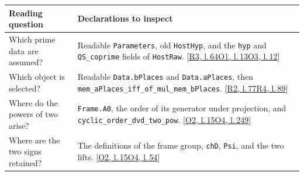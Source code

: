 \documentclass[12pt,letterpaper]{article}
\newcommand{\id}[1]{{\small\nolinkurl{#1}}}
\begin{document}
\begin{center}\small
\begin{tabularx}{\linewidth}{@{}p{.29\linewidth}Y@{}}\toprule
Reading question & Declarations to inspect\\\midrule
Which prime data are assumed? & Readable \id{Parameters}, old \id{HostHyp}, and the \id{hyp} and \id{QS_coprime} fields of \id{HostRaw}.  {\footnotesize\sffamily\color{mute}[\href{https://github.com/leanprover-community/riemann-hypothesis/blob/e063a923620ee7787b4a1270421478645bf66bdb/src/New/Reduction/Data/FieldsAndPlaces.lean\#L64}{R3, l.\,64}\enspace \href{https://github.com/nousentllc/riemann-hypothesis/blob/40e56bab026552e089d7afcfeff08d2defb9c005/src/Formalism/FrobeniusOrbits/Statement.lean\#L13}{O1, l.\,13}\enspace \href{https://github.com/nousentllc/riemann-hypothesis/blob/40e56bab026552e089d7afcfeff08d2defb9c005/src/Formalism/SharpRestriction/RamificationFrobenius/TotientGaloisClasses/ConjEMemHostFIff.lean\#L12}{O3, l.\,12}]}\\
Which object is selected? & Readable \id{Data.bPlaces} and \id{Data.aPlaces}, then \id{mem_aPlaces_iff_of_mul_mem_bPlaces}.  {\footnotesize\sffamily\color{mute}[\href{https://github.com/leanprover-community/riemann-hypothesis/blob/e063a923620ee7787b4a1270421478645bf66bdb/src/New/Reduction/Data/AdmissibleData.lean\#L77}{R2, l.\,77}\enspace \href{https://github.com/leanprover-community/riemann-hypothesis/blob/e063a923620ee7787b4a1270421478645bf66bdb/src/New/Reduction/PrimeSums.lean\#L89}{R4, l.\,89}]}\\
Where do the powers of two arise? & \id{Frame.A0}, the order of its generator under projection, and \id{cyclic_order_dvd_two_pow}.  {\footnotesize\sffamily\color{mute}[\href{https://github.com/nousentllc/riemann-hypothesis/blob/40e56bab026552e089d7afcfeff08d2defb9c005/src/Formalism/SharpRestriction/RamificationFrobenius/TotientGaloisClasses/ZsmulGeneratorEqZeroOfProjection.lean\#L15}{O2, l.\,15}\enspace \href{https://github.com/nousentllc/riemann-hypothesis/blob/40e56bab026552e089d7afcfeff08d2defb9c005/src/Formalism/SharpRestriction/RamificationFrobenius/TotientGaloisClasses/FrameFacts.lean\#L249}{O4, l.\,249}]}\\
Where are the two signs retained? & The definitions of the frame group, \id{chD}, \id{Psi}, and the two lifts.  {\footnotesize\sffamily\color{mute}[\href{https://github.com/nousentllc/riemann-hypothesis/blob/40e56bab026552e089d7afcfeff08d2defb9c005/src/Formalism/SharpRestriction/RamificationFrobenius/TotientGaloisClasses/ZsmulGeneratorEqZeroOfProjection.lean\#L15}{O2, l.\,15}\enspace \href{https://github.com/nousentllc/riemann-hypothesis/blob/40e56bab026552e089d7afcfeff08d2defb9c005/src/Formalism/SharpRestriction/RamificationFrobenius/TotientGaloisClasses/FrameFacts.lean\#L54}{O4, l.\,54}]}\\

\end{tabularx}
\end{center}
\end{document}
